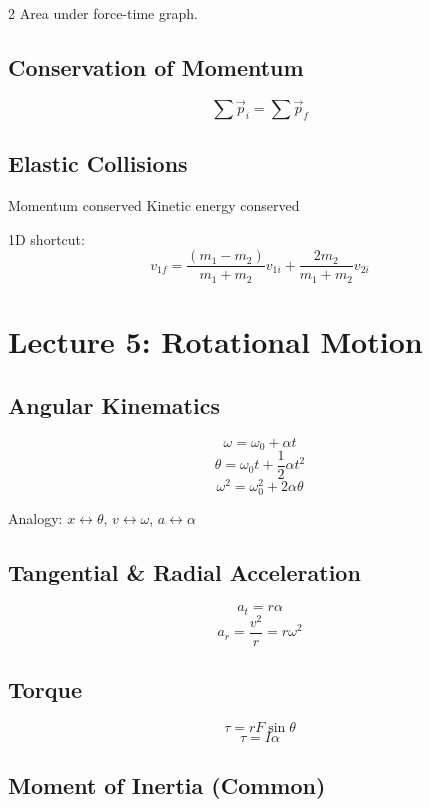 \documentclass[10pt,landscape]{article}
\begin{document}
\begin{multicols}{2}
Area under force-time graph.

\subsection*{Conservation of Momentum}

\[
\sum \vec{p}_i = \sum \vec{p}_f
\]

\subsection*{Elastic Collisions}

Momentum conserved  
Kinetic energy conserved  

1D shortcut:
\[
v_{1f} = \frac{(m_1-m_2)}{m_1+m_2}v_{1i} + \frac{2m_2}{m_1+m_2}v_{2i}
\]


\section*{Lecture 5: Rotational Motion}

\subsection*{Angular Kinematics}

\[
\omega = \omega_0 + \alpha t
\]
\[
\theta = \omega_0 t + \frac{1}{2}\alpha t^2
\]
\[
\omega^2 = \omega_0^2 + 2\alpha\theta
\]

Analogy: $x \leftrightarrow \theta$, $v \leftrightarrow \omega$, $a \leftrightarrow \alpha$

\subsection*{Tangential \& Radial Acceleration}

\[
a_t = r\alpha
\]
\[
a_r = \frac{v^2}{r} = r\omega^2
\]

\subsection*{Torque}

\[
\tau = rF\sin\theta
\]
\[
\tau = I\alpha
\]

\subsection*{Moment of Inertia (Common)}


\end{multicols}
\end{document}
